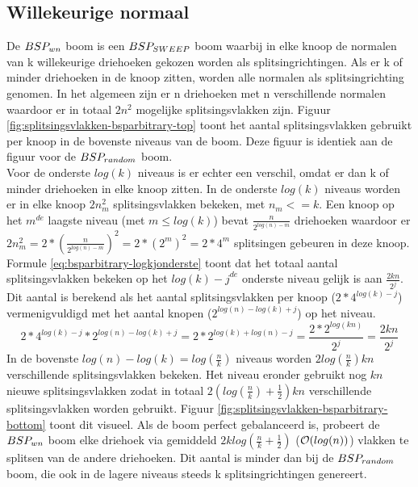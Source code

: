 \subsection{Willekeurige normaal}
    De $BSP_{wn}$ boom is een $BSP_{SWEEP}$ boom waarbij in elke knoop de normalen van k willekeurige driehoeken gekozen worden als splitsingrichtingen.
    Als er k of minder driehoeken in de knoop zitten, worden alle normalen als splitsingrichting genomen.
    In het algemeen zijn er n driehoeken met n verschillende normalen waardoor er in totaal $2n^2$ mogelijke splitsingsvlakken zijn.
    Figuur \ref{fig:splitsingsvlakken-bsparbitrary-top} toont het aantal splitsingsvlakken gebruikt per knoop in de bovenste niveaus van de boom.
    Deze figuur is identiek aan de figuur voor de $BSP_{random}$ boom. \\

    Voor de onderste $log(k)$ niveaus is er echter een verschil, omdat er dan k of minder driehoeken in elke knoop zitten.
    In de onderste $log(k)$ niveaus worden er in elke knoop $2n_m^2$ splitsingsvlakken bekeken, met $n_m <= k$.
    Een knoop op het $m^{de}$ laagste niveau (met $m \leq log(k)$) bevat $\frac{n}{2^{log(n) - m}}$ driehoeken waardoor er $2n_m^2 = 2 * (\frac{n}{2^{log(n) - m}})^2 = 2*(2^m)^2 = 2*4^m$ splitsingen gebeuren in deze knoop.
    Formule \ref{eq:bsparbitrary-logkjonderste} toont dat het totaal aantal splitsingsvlakken bekeken op het ${log(k) - j}^{de}$ onderste niveau gelijk is aan $\frac{2kn}{2^j}$. Dit aantal is berekend als het aantal splitsingsvlakken per knoop ($2*4^{log(k) - j}$) vermenigvuldigd met het aantal knopen ($2^{log(n)-log(k)+j}$) op het niveau.
    \begin{equation}
        \label{eq:bsparbitrary-logkjonderste}
    2*4^{log(k) - j} * 2^{log(n)-log(k)+j} = 2 * 2^{log(k) + log(n) - j} = \frac{2 * 2^{log(kn)}}{2^j} =\frac{2kn}{2^j}
    \end{equation}
    In de bovenste $log(n) - log(k) = log(\frac{n}{k})$ niveaus worden $2log(\frac{n}{k})kn$ verschillende splitsingsvlakken bekeken.
    Het niveau eronder gebruikt nog $kn$ nieuwe splitsingsvlakken zodat in totaal $2(log(\frac{n}{k}) + \frac{1}{2})kn$ verschillende splitsingsvlakken worden gebruikt.
    Figuur \ref{fig:splitsingsvlakken-bsparbitrary-bottom} toont dit visueel.
    Als de boom perfect gebalanceerd is, probeert de $BSP_{wn}$ boom elke driehoek via gemiddeld $2klog(\frac{n}{k} + \frac{1}{2})$ ($\mathcal{O}(log(n))$) vlakken te splitsen van de andere driehoeken. Dit aantal is minder dan bij de $BSP_{random}$ boom, die ook in de lagere niveaus steeds k splitsingrichtingen genereert.\\

